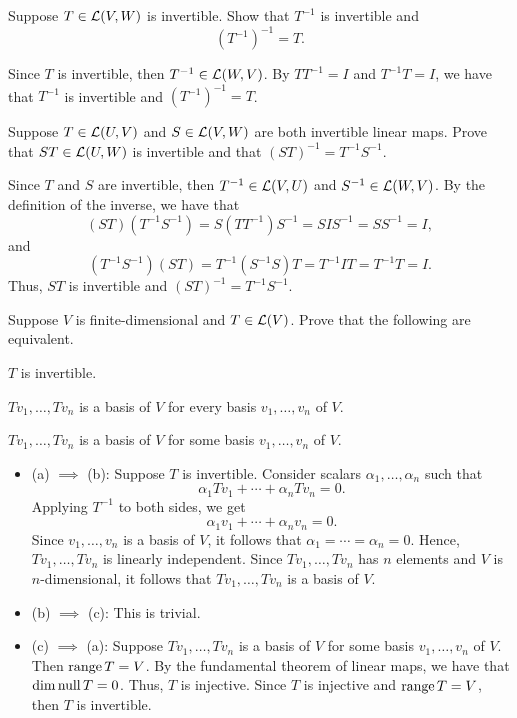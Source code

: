 \begin{exc}

\begin{exercise}
Suppose $T\in\mathcal{L}(V,W)$ is invertible. Show that $T^{-1}$ is invertible and
\[ (T^{-1})^{-1} = T. \]
\end{exercise}
\begin{solution}
Since $T$ is invertible, then $T^{-1}\in\mathcal{L}(W,V)$. By $TT^{-1}=I$ and
$T^{-1}T=I$, we have that $T^{-1}$ is invertible and $(T^{-1})^{-1}=T$.
\end{solution}

\begin{exercise}
Suppose $T\in\mathcal{L}(U,V)$ and $S\in\mathcal{L}(V,W)$ are both invertible linear maps.
Prove that $ST\in\mathcal{L}(U,W)$ is invertible and that $(ST)^{-1}=T^{-1}S^{-1}$.
\end{exercise}
\begin{solution}
Since $T$ and $S$ are invertible, then $T^{-1}\in\mathcal{L}(V,U)$ and
$S^{-1}\in\mathcal{L}(W,V)$. By the definition of the inverse, we have that
\[ (ST)(T^{-1}S^{-1}) = S(TT^{-1})S^{-1} = SIS^{-1} = SS^{-1} = I, \]
and
\[ (T^{-1}S^{-1})(ST) = T^{-1}(S^{-1}S)T = T^{-1}IT = T^{-1}T = I. \]
Thus, $ST$ is invertible and $(ST)^{-1}=T^{-1}S^{-1}$.
\end{solution}

\begin{exercise}
Suppose $V$ is finite-dimensional and $T\in\mathcal{L}(V)$. Prove that the following
are equivalent.
\begin{parts}
\item $T$ is invertible.
\item $Tv_1,\dots,Tv_n$ is a basis of $V$ for every basis $v_1,\dots,v_n$ of
  $V$.
\item $Tv_1,\dots,Tv_n$ is a basis of $V$ for some basis $v_1,\dots,v_n$ of $V$.
\end{parts}
\end{exercise}
\begin{solution}\leavevmode
\begin{itemize}
\item (a) $\implies$ (b): Suppose $T$ is invertible. Consider scalars
  $\alpha_1,\dots,\alpha_n$ such that
  \[ \alpha_1Tv_1+\cdots+\alpha_nTv_n = 0. \]
  Applying $T^{-1}$ to both sides, we get
  \[ \alpha_1v_1+\cdots+\alpha_nv_n = 0. \]
  Since $v_1,\dots,v_n$ is a basis of $V$, it follows that
  $\alpha_1=\cdots=\alpha_n=0$. Hence, $Tv_1,\dots,Tv_n$ is linearly
  independent. Since $Tv_1,\dots,Tv_n$ has $n$ elements and $V$ is
  $n$-dimensional, it follows that $Tv_1,\dots,Tv_n$ is a basis of $V$.
\item (b) $\implies$ (c): This is trivial.
\item (c) $\implies$ (a): Suppose $Tv_1,\dots,Tv_n$ is a basis of $V$ for some
  basis $v_1,\dots,v_n$ of $V$. Then $\operatorname{range} T=V$. By the fundamental theorem of
  linear maps, we have that $\operatorname{dim}\operatorname{null} T=0$. Thus, $T$ is injective. Since $T$ is
  injective and $\operatorname{range} T=V$, then $T$ is invertible.
\end{itemize}
\end{solution}


\end{exc}
